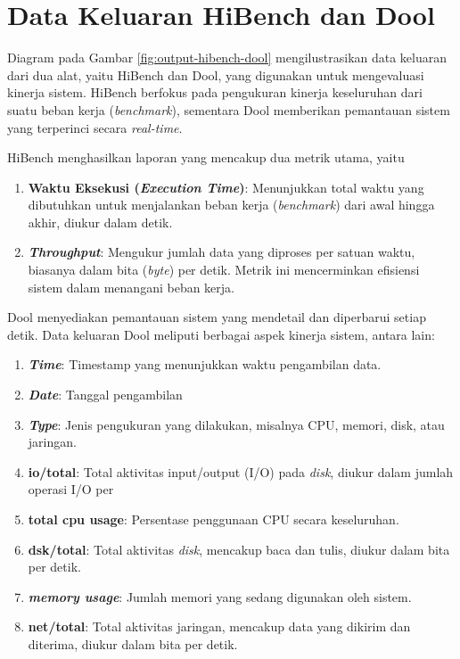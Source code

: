 \section{Data Keluaran HiBench dan Dool}
Diagram pada Gambar \ref{fig:output-hibench-dool} mengilustrasikan data keluaran dari dua alat, yaitu HiBench dan Dool, yang digunakan untuk mengevaluasi kinerja sistem. HiBench berfokus pada pengukuran kinerja keseluruhan dari suatu beban kerja (\textit{benchmark}), sementara Dool memberikan pemantauan sistem yang terperinci secara \textit{real-time}.

HiBench menghasilkan laporan yang mencakup dua metrik utama, yaitu
\begin{enumerate}
	\item \textbf{Waktu Eksekusi (\textit{Execution Time})}: Menunjukkan total waktu yang dibutuhkan untuk menjalankan beban kerja (\textit{benchmark}) dari awal hingga akhir, diukur dalam detik.
	\item \textbf{\textit{Throughput}}: Mengukur jumlah data yang diproses per satuan waktu, biasanya dalam bita (\textit{byte}) per detik. Metrik ini mencerminkan efisiensi sistem dalam menangani beban kerja.
\end{enumerate}

Dool menyediakan pemantauan sistem yang mendetail dan diperbarui setiap detik. Data keluaran Dool meliputi berbagai aspek kinerja sistem, antara lain:
\begin{enumerate}
	\item \textbf{\textit{Time}}: Timestamp yang menunjukkan waktu pengambilan data.
	\item \textbf{\textit{Date}}: Tanggal pengambilan 
	\item \textbf{\textit{Type}}: Jenis pengukuran yang dilakukan, misalnya CPU, memori, disk, atau jaringan. 
	\item \textbf{io/total}: Total aktivitas input/output (I/O) pada \textit{disk}, diukur dalam jumlah operasi I/O per 
	\item \textbf{total cpu usage}: Persentase penggunaan CPU secara keseluruhan.
	\item \textbf{dsk/total}: Total aktivitas \textit{disk}, mencakup baca dan tulis, diukur dalam bita per detik.
	\item \textbf{\textit{memory usage}}: Jumlah memori yang sedang digunakan oleh sistem.
	\item \textbf{net/total}: Total aktivitas jaringan, mencakup data yang dikirim dan diterima, diukur dalam bita per detik.
\end{enumerate}

